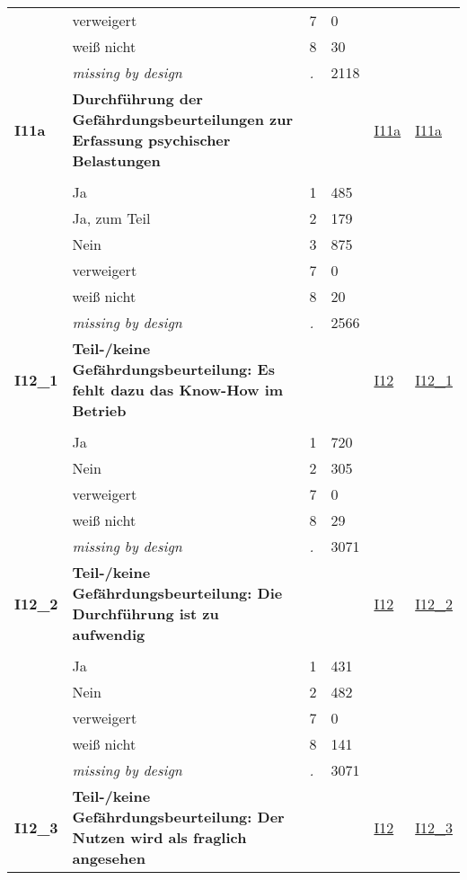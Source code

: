 \begin{longtable}{| L{2.45cm} | L{6cm} | C{1.5cm} | R{1cm} | C{2.25cm} | C{2.25cm} |}
   & verweigert & 7 & 0 &  &  \\ 
   & weiß nicht & 8 & 30 &  &  \\ 
   & \textit{missing by design} & \textit{.} & 2118 &  &  \\ 
   \midrule
\textbf{I11a}\label{var:I11a} & \textbf{Durchführung der Gefährdungsbeurteilungen zur Erfassung psychischer Belastungen} &  &  & \hyperref[I11a]{I11a} & \hyperref[var:suf:I11a]{I11a} \\ 
   &  &  &  &  &  \\ 
   & Ja & 1 & 485 &  &  \\ 
   & Ja, zum Teil & 2 & 179 &  &  \\ 
   & Nein & 3 & 875 &  &  \\ 
   & verweigert & 7 & 0 &  &  \\ 
   & weiß nicht & 8 & 20 &  &  \\ 
   & \textit{missing by design} & \textit{.} & 2566 &  &  \\ 
   \midrule
\textbf{I12\_1}\label{var:I12:1} & \textbf{Teil-/keine Gefährdungsbeurteilung: Es fehlt dazu das Know-How im Betrieb} &  &  & \hyperref[I12]{I12} & \hyperref[var:suf:I12:1]{I12\_1} \\ 
   &  &  &  &  &  \\ 
   & Ja & 1 & 720 &  &  \\ 
   & Nein & 2 & 305 &  &  \\ 
   & verweigert & 7 & 0 &  &  \\ 
   & weiß nicht & 8 & 29 &  &  \\ 
   & \textit{missing by design} & \textit{.} & 3071 &  &  \\ 
   \midrule
\textbf{I12\_2}\label{var:I12:2} & \textbf{Teil-/keine Gefährdungsbeurteilung: Die Durchführung ist zu aufwendig} &  &  & \hyperref[I12]{I12} & \hyperref[var:suf:I12:2]{I12\_2} \\ 
   &  &  &  &  &  \\ 
   & Ja & 1 & 431 &  &  \\ 
   & Nein & 2 & 482 &  &  \\ 
   & verweigert & 7 & 0 &  &  \\ 
   & weiß nicht & 8 & 141 &  &  \\ 
   & \textit{missing by design} & \textit{.} & 3071 &  &  \\ 
   \midrule
\textbf{I12\_3}\label{var:I12:3} & \textbf{Teil-/keine Gefährdungsbeurteilung: Der Nutzen wird als fraglich angesehen} &  &  & \hyperref[I12]{I12} & \hyperref[var:suf:I12:3]{I12\_3} \\ 

\end{longtable}
